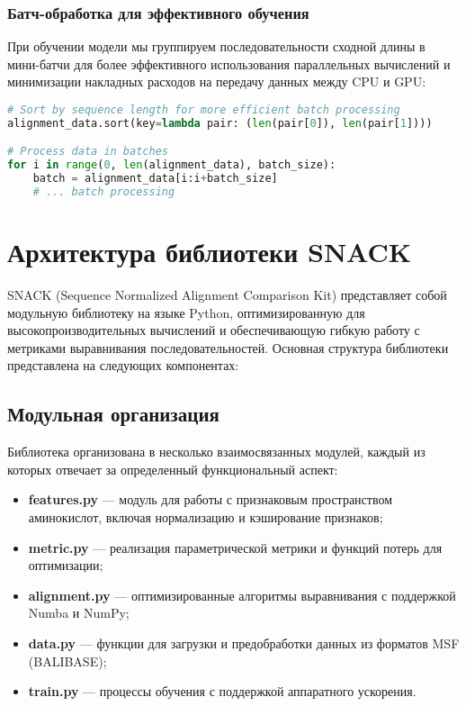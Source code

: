 \documentclass[12pt]{article}
\begin{document}
\subsubsection{Батч-обработка для эффективного обучения}

При обучении модели мы группируем последовательности сходной длины в мини-батчи для более эффективного использования параллельных вычислений и минимизации накладных расходов на передачу данных между CPU и GPU:

\begin{lstlisting}[language=Python]
# Sort by sequence length for more efficient batch processing
alignment_data.sort(key=lambda pair: (len(pair[0]), len(pair[1])))

# Process data in batches
for i in range(0, len(alignment_data), batch_size):
    batch = alignment_data[i:i+batch_size]
    # ... batch processing
\end{lstlisting}

\section{Архитектура библиотеки SNACK}

SNACK (Sequence Normalized Alignment Comparison Kit) представляет собой модульную библиотеку на языке Python, оптимизированную для высокопроизводительных вычислений и обеспечивающую гибкую работу с метриками выравнивания последовательностей. Основная структура библиотеки представлена на следующих компонентах:

\subsection{Модульная организация}

Библиотека организована в несколько взаимосвязанных модулей, каждый из которых отвечает за определенный функциональный аспект:

\begin{itemize}
\item \textbf{features.py} — модуль для работы с признаковым пространством аминокислот, включая нормализацию и кэширование признаков;
\item \textbf{metric.py} — реализация параметрической метрики и функций потерь для оптимизации;
\item \textbf{alignment.py} — оптимизированные алгоритмы выравнивания с поддержкой Numba и NumPy;
\item \textbf{data.py} — функции для загрузки и предобработки данных из форматов MSF (BALIBASE);
\item \textbf{train.py} — процессы обучения с поддержкой аппаратного ускорения.
\end{itemize}
\end{document}
